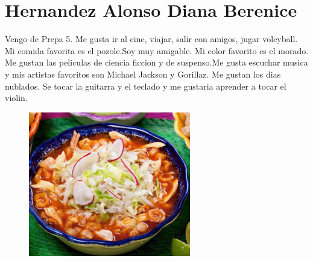 \chapter{Hernandez Alonso Diana Berenice}
Vengo de Prepa 5. Me gusta ir al cine, viajar, salir con amigos, jugar voleyball.
Mi comida favorita es el pozole.Soy muy amigable.
Mi color favorito es el morado. Me gustan las peliculas de ciencia ficcion y de suspenso.Me gusta escuchar musica y mis artistas favoritos son Michael Jackson y Gorillaz. Me gustan los dias nublados. Se tocar la guitarra y el teclado y me gustaria aprender a tocar el violin.
\begin {figure} [h!]
  \includegraphics[width=200pt]{317183425/pozole.jpg}
\end {figure}

